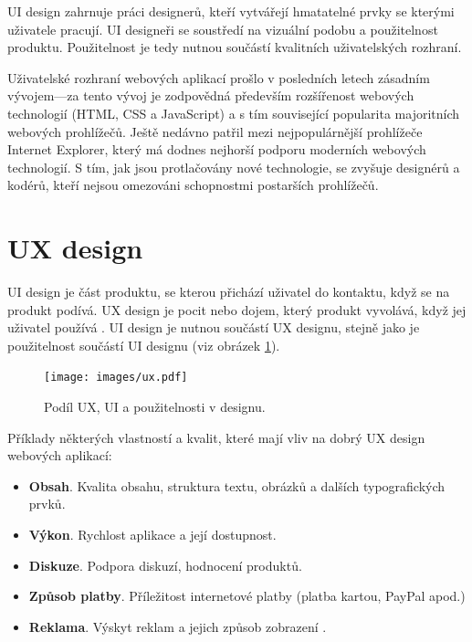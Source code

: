 UI design zahrnuje práci designerů, kteří vytvářejí hmatatelné prvky se kterými uživatele pracují. UI designeři se soustředí na vizuální podobu a použitelnost produktu. Použitelnost je tedy nutnou součástí kvalitních uživatelských rozhraní.

Uživatelské rozhraní webových aplikací prošlo v posledních letech zásadním vývojem---za tento vývoj je zodpovědná především rozšířenost webových technologií (HTML, CSS a JavaScript) a s tím související popularita majoritních webových prohlížečů. Ještě nedávno patřil mezi nejpopulárnější prohlížeče Internet Explorer, který má dodnes nejhorší podporu moderních webových technologií. S tím, jak jsou protlačovány nové technologie, se zvyšuje  designérů a kodérů, kteří nejsou omezováni schopnostmi postarších prohlížečů.

\section{UX design}
\label{sec:uxdesign}

UI design je část produktu, se kterou přichází uživatel do kontaktu, když se na produkt podívá. UX design je pocit nebo dojem, který produkt vyvolává, když jej uživatel používá \cite{ui-vs-ux}. UI design je nutnou součástí UX designu, stejně jako je použitelnost součástí UI designu (viz obrázek \ref{fig:ux-ui-usability}).

\begin{figure}[htbp]
    \centering
    \texttt{[image: images/ux.pdf]}
    \caption{Podíl UX, UI a použitelnosti v designu.}
    \label{fig:ux-ui-usability}
\end{figure}

Příklady některých vlastností a kvalit, které mají vliv na dobrý UX design webových aplikací:

\begin{itemize}
    \item \textbf{Obsah}. Kvalita obsahu, struktura textu, obrázků a dalších typografických prvků.
    \item \textbf{Výkon}. Rychlost aplikace a její dostupnost.
    \item \textbf{Diskuze}. Podpora diskuzí, hodnocení produktů.
    \item \textbf{Způsob platby}. Příležitost internetové platby (platba kartou, PayPal apod.)
    \item \textbf{Reklama}. Výskyt reklam a jejich způsob zobrazení \cite{understanding-ux-ui}.
\end{itemize}

